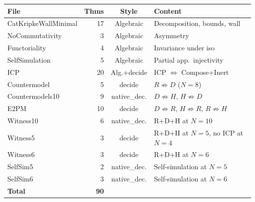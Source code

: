 \documentclass[sigconf,screen]{acmart}
\theoremstyle{remark}
\begin{document}
\medskip
{\small
\begin{tabular}{lrcl}
\textbf{File} & \textbf{Thms} & \textbf{Style} & \textbf{Content} \\
\hline
CatKripkeWallMinimal & 17 & Algebraic & Decomposition, bounds, wall \\
NoCommutativity      &  3 & Algebraic & Asymmetry \\
Functoriality        &  4 & Algebraic & Invariance under iso \\
SelfSimulation       &  5 & Algebraic & Partial app.\ injectivity \\
ICP                  & 20 & Alg.+decide & ICP $\Leftrightarrow$ Compose+Inert \\
Countermodel         &  5 & decide & $R \not\Rightarrow D$ ($N\!=\!8$) \\
Countermodels10      &  9 & native\_dec. & $D \not\Rightarrow H$, $H \not\Rightarrow D$ \\
E2PM                 & 10 & decide & $D \not\Rightarrow R$, $H \not\Rightarrow R$, $R \not\Rightarrow H$ \\
Witness10            &  6 & native\_dec. & R+D+H at $N\!=\!10$ \\
Witness5             &  3 & decide & R+D+H at $N\!=\!5$, no ICP at $N\!=\!4$ \\
Witness6             &  3 & decide & R+D+H at $N\!=\!6$ \\
SelfSim5             &  2 & native\_dec. & Self-simulation at $N\!=\!5$ \\
SelfSim6             &  3 & native\_dec. & Self-simulation at $N\!=\!6$ \\
\hline
\textbf{Total}       & \textbf{90} & & \\
\end{tabular}}
\end{document}
